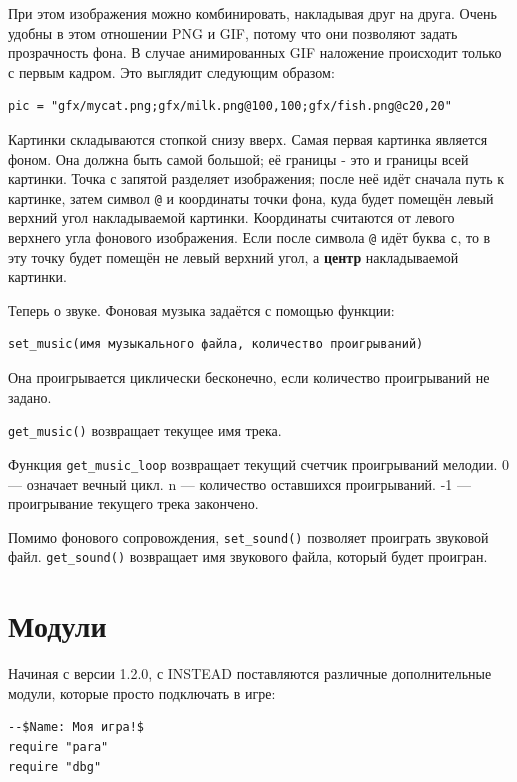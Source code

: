 \documentclass[a4paper,12pt]{article}
\begin{document}
При этом изображения можно комбинировать, накладывая друг на друга. Очень удобны в этом отношении PNG и GIF, потому что они позволяют задать прозрачность фона.
В случае анимированных GIF наложение происходит только с первым кадром.
Это выглядит следующим образом:

\begin{verbatim}
pic = "gfx/mycat.png;gfx/milk.png@100,100;gfx/fish.png@c20,20"
\end{verbatim}

Картинки складываются стопкой снизу вверх. Самая первая картинка является фоном. Она должна быть самой большой; её границы - это и границы всей картинки.
Точка с запятой разделяет изображения; после неё идёт сначала путь к картинке, затем символ \verb/@/ и координаты точки фона, куда будет помещён левый верхний угол накладываемой картинки.
Координаты считаются от левого верхнего угла фонового изображения. Если после символа \verb/@/ идёт буква \verb/c/, то в эту точку будет помещён не левый верхний угол, а \textbf{центр} накладываемой картинки.

Теперь о звуке. Фоновая музыка задаётся с помощью функции:

\begin{verbatim}
set_music(имя музыкального файла, количество проигрываний)
\end{verbatim}

Она проигрывается циклически бесконечно, если количество проигрываний не задано.

 \verb/get_music()/ возвращает текущее имя трека.

 Функция \verb/get_music_loop/ возвращает текущий счетчик проигрываний мелодии. 0 --- означает вечный цикл. n --- количество оставшихся проигрываний. -1 --- проигрывание текущего трека закончено.

Помимо фонового сопровождения, \verb/set_sound()/ позволяет проиграть звуковой файл. \verb/get_sound()/ возвращает имя звукового файла, который будет проигран.

\section{Модули}
Начиная с версии 1.2.0, с INSTEAD поставляются различные дополнительные модули, которые просто подключать в игре:

\begin{verbatim}
--$Name: Моя игра!$
require "para"
require "dbg"
\end{verbatim}
\end{document}

